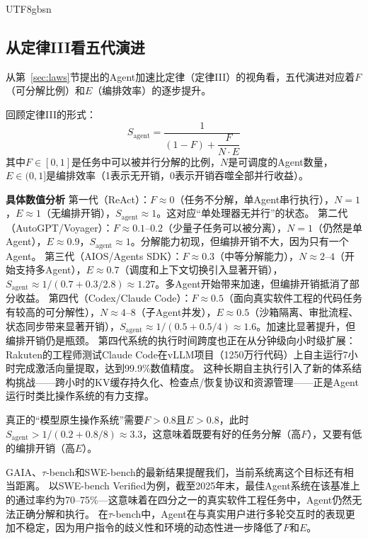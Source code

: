 \documentclass[11pt,a4paper]{article}
\begin{document}
\begin{CJK*}{UTF8}{gbsn}
\subsection*{从定律III看五代演进}

从第~\ref{sec:laws}节提出的Agent加速比定律（定律III）的视角看，五代演进对应着$F$（可分解比例）和$E$（编排效率）的逐步提升。

回顾定律III的形式：
\begin{equation}
\label{eq:agent_law_review}
S_{\mathrm{agent}} = \frac{1}{(1-F) + \dfrac{F}{N \cdot E}}
\end{equation}
其中$F \in [0,1]$是任务中可以被并行分解的比例，$N$是可调度的Agent数量，$E \in (0,1]$是编排效率（1表示无开销，0表示开销吞噬全部并行收益）。

\textbf{具体数值分析}
第一代（ReAct）：$F \approx 0$（任务不分解，单Agent串行执行），$N=1$，$E \approx 1$（无编排开销），$S_{\mathrm{agent}} \approx 1$。这对应``单处理器无并行''的状态。
第二代（AutoGPT/Voyager）：$F \approx 0.1$--$0.2$（少量子任务可以被分离），$N=1$（仍然是单Agent），$E \approx 0.9$，$S_{\mathrm{agent}} \approx 1$。分解能力初现，但编排开销不大，因为只有一个Agent。
第三代（AIOS/Agents SDK）：$F \approx 0.3$（中等分解能力），$N \approx 2$--$4$（开始支持多Agent），$E \approx 0.7$（调度和上下文切换引入显著开销），$S_{\mathrm{agent}} \approx 1/(0.7 + 0.3/2.8) \approx 1.27$。多Agent开始带来加速，但编排开销抵消了部分收益。
第四代（Codex/Claude Code）：$F \approx 0.5$（面向真实软件工程的代码任务有较高的可分解性），$N \approx 4$--$8$（子Agent并发），$E \approx 0.5$（沙箱隔离、审批流程、状态同步带来显著开销），$S_{\mathrm{agent}} \approx 1/(0.5 + 0.5/4) \approx 1.6$。加速比显著提升，但编排开销仍是瓶颈。
第四代系统的执行时间跨度也正在从分钟级向小时级扩展：Rakuten的工程师测试Claude Code在vLLM项目（1250万行代码）上自主运行7小时完成激活向量提取，达到99.9\%数值精度\cite{anthropic2026agenticreport}。
这种长期自主执行引入了新的体系结构挑战——跨小时的KV缓存持久化、检查点/恢复协议和资源管理——正是Agent运行时类比操作系统的有力支撑。

真正的``模型原生操作系统''需要$F > 0.8$且$E > 0.8$，此时$S_{\mathrm{agent}} > 1/(0.2 + 0.8/8) \approx 3.3$，这意味着既要有好的任务分解（高$F$），又要有低的编排开销（高$E$）。

GAIA\cite{gaia2023}、$\tau$-bench\cite{taubench2024}和SWE-bench\cite{swebench2023}的最新结果提醒我们，当前系统离这个目标还有相当距离。
以SWE-bench Verified为例，截至2025年末，最佳Agent系统在该基准上的通过率约为70--75\%---这意味着在四分之一的真实软件工程任务中，Agent仍然无法正确分解和执行。
在$\tau$-bench中，Agent在与真实用户进行多轮交互时的表现更加不稳定，因为用户指令的歧义性和环境的动态性进一步降低了$F$和$E$。


\end{CJK*}
\end{document}
